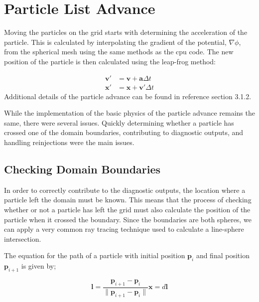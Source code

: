  
	\section{Particle List Advance}
	
Moving the particles on the grid starts with determining the acceleration of the particle. This is calculated by interpolating the gradient of the potential, $\nabla\phi$, from the spherical mesh using the same methods as the cpu code. The new position of the particle is then calculated using the leap-frog method:

\begin{equation}
\begin{aligned}
\mathbf{v}' &= \mathbf{v}+\mathbf{a}\Delta t \\
\mathbf{x}' &= \mathbf{x}+\mathbf{v}'\Delta t
\end{aligned}
\end{equation}
 Additional details of the particle advance can be found in reference \cite{Patacchini2007} section 3.1.2.
		
While the implementation of the basic physics of the particle advance remains the same, there were several issues. Quickly determining whether a particle has crossed one of the domain boundaries, contributing to diagnostic outputs, and handling reinjections were the main issues. 

		\subsection{Checking Domain Boundaries}
In order to correctly contribute to the diagnostic outputs, the location where a particle left the domain must be known. This means that the process of checking whether or not a particle has left the grid must also calculate the position of the particle when it crossed the boundary. Since the boundaries are both spheres, we can apply a very common ray tracing technique used to calculate a line-sphere intersection. 

The equation for the path of a particle with initial position $\mathbf{p}_i$ and final position $\mathbf{p}_{i+1}$ is given by;

\begin{equation}
 \mathbf{l} = \frac{\mathbf{p}_{i+1} - \mathbf{p}_{i}}{\|\mathbf{p}_{i+1} - \mathbf{p}_{i}\|}
\mathbf{x} = d\mathbf{l}
\label{eqn:p_direction}
\end{equation}

